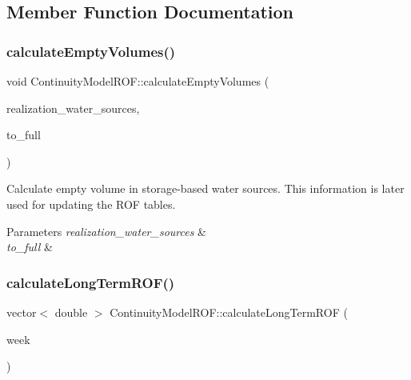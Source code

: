 \subsection{Member Function Documentation}
\mbox{\label{classContinuityModelROF_aa720006d12410fc35b8768eda716c149_aa720006d12410fc35b8768eda716c149}} 
\subsubsection{\texorpdfstring{calculate\+Empty\+Volumes()}{calculateEmptyVolumes()}}
{\footnotesize\ttfamily void Continuity\+Model\+R\+O\+F\+::calculate\+Empty\+Volumes (\begin{DoxyParamCaption}\item[{vector$<$ \mbox{\hyperlink{classWaterSource}{Water\+Source}} $\ast$$>$ \&}]{realization\+\_\+water\+\_\+sources,  }\item[{double $\ast$}]{to\+\_\+full }\end{DoxyParamCaption})}

Calculate empty volume in storage-\/based water sources. This information is later used for updating the R\+OF tables. 
\begin{DoxyParams}{Parameters}
{\em realization\+\_\+water\+\_\+sources} & \\
\hline
{\em to\+\_\+full} & \\
\hline
\end{DoxyParams}
\mbox{\label{classContinuityModelROF_ab6e6125e6ea195d7c29a0c6d2203d51c_ab6e6125e6ea195d7c29a0c6d2203d51c}} 
\subsubsection{\texorpdfstring{calculate\+Long\+Term\+R\+O\+F()}{calculateLongTermROF()}}
{\footnotesize\ttfamily vector$<$ double $>$ Continuity\+Model\+R\+O\+F\+::calculate\+Long\+Term\+R\+OF (\begin{DoxyParamCaption}\item[{int}]{week }\end{DoxyParamCaption})}

